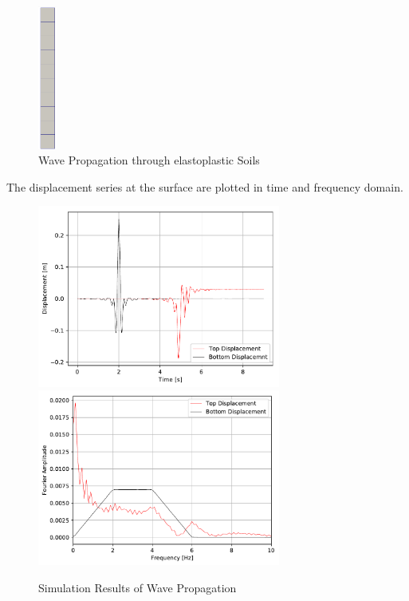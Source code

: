 \begin{figure}[H]
  \centering
  \includegraphics[width = 0.6cm]{./Figure-files/Day3/Wave_Propagation_through_elastoplastic_Soil/overview.png}
  \caption{Wave Propagation through elastoplastic Soils}
  \label{fig_wave_propagation_elastoplastic}
\end{figure}


The displacement series at the surface are plotted in time and frequency domain.


\begin{figure}[H]
  \centering
  \includegraphics[width = 8cm]{./Figure-files/Day3/Wave_Propagation_through_elastoplastic_Soil/Displacement.pdf}
  \includegraphics[width = 8cm]{./Figure-files/Day3/Wave_Propagation_through_elastoplastic_Soil/Displacement_Spectrum.pdf}
  \caption{Simulation Results of Wave Propagation}
  \label{fig_elastic_plastic_wave_propagation}
\end{figure}


